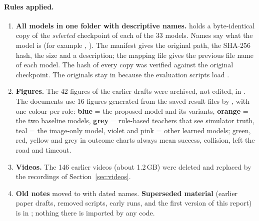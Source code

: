 \paragraph{Rules applied.}
\begin{enumerate}
\item \textbf{All models in one folder with descriptive names.}  holds a byte-identical copy of the \emph{selected} checkpoint of each of the 33 models. Names say what the model is (for example , ). The manifest gives the original path, the SHA-256 hash, the size and a description; the mapping file gives the previous file name of each model. The hash of every copy was verified against the original checkpoint. The originals stay in  because the evaluation scripts load .
\item \textbf{Figures.} The 42 figures of the earlier drafts were archived, not edited, in . The documents use 16 figures generated from the saved result files by , with one colour per role: \textcolor{proposedblue}{\textbf{blue}} = the proposed model and its variants, \textcolor{baselineorange}{\textbf{orange}} = the two baseline models, \textcolor{ruleblack}{\textbf{grey}} = rule-based teachers that see simulator truth, teal = the image-only model, violet and pink = other learned models; green, red, yellow and grey in outcome charts always mean success, collision, left the road and timeout.
\item \textbf{Videos.} The 146 earlier videos (about 1.2\,GB) were deleted and replaced by the recordings of Section~\ref{sec:videos}.
\item \textbf{Old notes} moved to  with dated names. \textbf{Superseded material} (earlier paper drafts, removed scripts, early runs, and the first version of this report) is in ; nothing there is imported by any code.
\end{enumerate}
